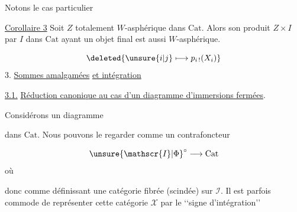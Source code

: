 Notons le cas particulier

\uline{Corollaire 3} Soit $Z$   totalement $W$-asphérique dans $\mathrm{Cat}$. Alors son produit $Z\times I$ par  $I$ dans $\mathrm{Cat}$ ayant un objet final est aussi  $W$-asphérique.


\[
\deleted{\unsure{i|j}\longmapsto p_{i\,!}(X_i)}
\]
3. \uline{Sommes amalgamées} \uline{et intégration}


\uline{3.1.} \uline{Réduction canonique au cas d'un diagramme d'immersions  fermées}.

Considérons un diagramme

dans $\mathrm{Cat}$. Nous pouvons le regarder comme un contrafoncteur

\[
\unsure{\mathscr{I}|\Phi}^{\circ}\longrightarrow\mathrm{Cat}
\]
où

donc comme définissant une catégorie fibrée (scindée)  sur $\mathscr{I}$. Il est parfois commode de représenter cette catégorie $\mathscr{X}$ par le \lq\lq signe d'intégration\rq\rq

